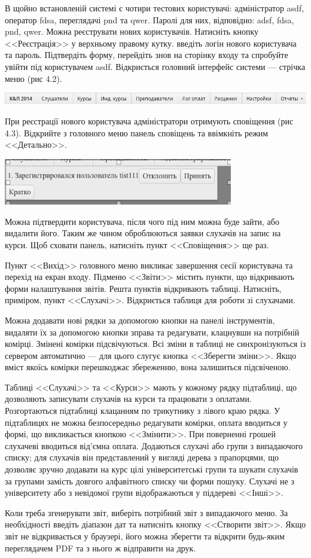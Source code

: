 В щойно встановленій системі є чотири тестових користувачі: адміністратор asdf, оператор fdsa, переглядачі pnd та qwer. Паролі для них, відповідно: adsf, fdsa, pnd, qwer. Можна реєструвати нових користувачів. Натисніть кнопку <<Реєстрація>> у верхньому правому кутку. введіть логін нового користувача та пароль. Підтвердіть форму, перейдіть знов на сторінку входу та спробуйте увійти під користувачем asdf. Відкриється головний інтерфейс системи --- стрічка меню (рис 4.2).

\noindent\includegraphics[width=17cm]{scrns/menu.png}

При реєстрації нового користувача адміністратори отримують сповіщення (рис 4.3). Відкрийте з головного меню панель сповіщень та ввімкніть режим <<Детально>>.
\begin{center}\includegraphics[width=10cm]{scrns/notifications.png}\end{center}

Можна підтвердити користувача, після чого під ним можна буде зайти, або видалити його. Таким же чином оброблюються заявки слухачів на запис на курси. Щоб сховати панель, натисніть пункт <<Сповіщення>> ще раз.

Пункт <<Вихід>> головного меню викликає завершення сесії користувача та перехід на екран входу. Підменю <<Звіти>> містить пункти, що відкривають форми налаштування звітів. Решта пунктів відкривають таблиці. Натисніть, приміром, пункт <<Слухачі>>. Відкриється таблиця для роботи зі слухачами.

Можна додавати нові рядки за допомогою кнопки на панелі інструментів, видаляти їх за допомогою кнопки зправа та редагувати, клацнувши на потрібній комірці. Змінені комірки підсвічуються. Всі зміни в таблиці не синхронізуються із сервером автоматично --- для цього слугує кнопка <<Зберегти зміни>>. Якщо вміст якоїсь комірки перешкоджає збереженню, вона залишиться підсвіченою.

Таблиці <<Слухачі>> та <<Курси>> мають у кожному рядку підтаблиці, що дозволяють записувати слухачів на курси та працювати з оплатами. Розгортаються підтаблиці клацанням по трикутнику з лівого краю рядка. У підтаблицях не можна безпосередньо редагувати комірки, оплата вводиться у формі, що викликається кнопкою <<Змінити>>. При поверненні грошей слухачеві вводиться від'ємна оплата. Додаються слухачі або групи з випадаючого списку; для слухачів він представлений у вигляді дерева з прапорцями, що дозволяє зручно додавати на курс цілі університетські групи та шукати слухачів за групами замість довгого алфавітного списку чи форми пошуку. Слухачі не з університету або з невідомої групи відображаються у піддереві <<Інші>>.

Коли треба згенерувати звіт, виберіть потрібний звіт з випадаючого меню. За необхідності введіть діапазон дат та натисніть кнопку <<Створити звіт>>. Якщо звіт не відкривається у браузері, його можна зберегти та відкрити будь-яким переглядачем PDF та з нього ж відправити на друк.
